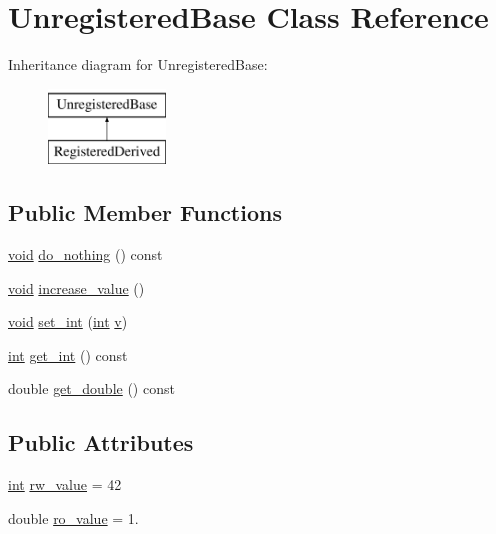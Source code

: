 \hypertarget{class_unregistered_base}{}\section{Unregistered\+Base Class Reference}
\label{class_unregistered_base}
Inheritance diagram for Unregistered\+Base\+:\begin{figure}[H]
\begin{center}
\leavevmode
\includegraphics[height=2.000000cm]{class_unregistered_base}
\end{center}
\end{figure}
\subsection*{Public Member Functions}
\begin{DoxyCompactItemize}
\item 
\mbox{\hyperlink{_s_d_l__opengles2__gl2ext_8h_ae5d8fa23ad07c48bb609509eae494c95}{void}} \mbox{\hyperlink{class_unregistered_base_a14d1855ccb40e24e8743cb17fed8a613}{do\+\_\+nothing}} () const
\item 
\mbox{\hyperlink{_s_d_l__opengles2__gl2ext_8h_ae5d8fa23ad07c48bb609509eae494c95}{void}} \mbox{\hyperlink{class_unregistered_base_a2c0aa0146aff9f458a3ac84269824b4d}{increase\+\_\+value}} ()
\item 
\mbox{\hyperlink{_s_d_l__opengles2__gl2ext_8h_ae5d8fa23ad07c48bb609509eae494c95}{void}} \mbox{\hyperlink{class_unregistered_base_a1e5f6656715131b9aeae3010d8979f7a}{set\+\_\+int}} (\mbox{\hyperlink{warnings_8h_a74f207b5aa4ba51c3a2ad59b219a423b}{int}} \mbox{\hyperlink{_s_d_l__opengl_8h_a10a82eabcb59d2fcd74acee063775f90}{v}})
\item 
\mbox{\hyperlink{warnings_8h_a74f207b5aa4ba51c3a2ad59b219a423b}{int}} \mbox{\hyperlink{class_unregistered_base_a7491bae5acdebd21c68bb94dbce13382}{get\+\_\+int}} () const
\item 
double \mbox{\hyperlink{class_unregistered_base_a034550079254a6b31b250868d42eb993}{get\+\_\+double}} () const
\end{DoxyCompactItemize}
\subsection*{Public Attributes}
\begin{DoxyCompactItemize}
\item 
\mbox{\hyperlink{warnings_8h_a74f207b5aa4ba51c3a2ad59b219a423b}{int}} \mbox{\hyperlink{class_unregistered_base_a56882486b2548378b21ef1a94b3eafdc}{rw\+\_\+value}} = 42
\item 
double \mbox{\hyperlink{class_unregistered_base_a6e5cc48161f673d009abb8a6d49c90ef}{ro\+\_\+value}} = 1.
\end{DoxyCompactItemize}


